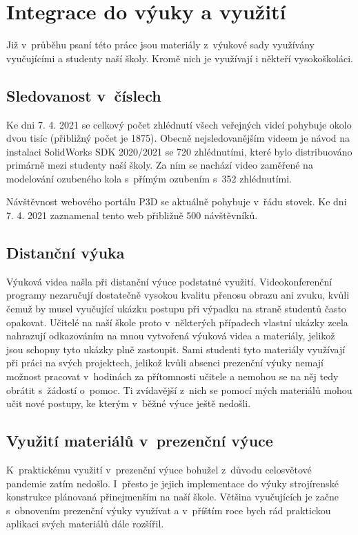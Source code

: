 \chapter{Integrace do výuky a využití}
Již v~průběhu psaní této práce jsou materiály z~výukové sady využívány vyučujícími a studenty naší školy.
Kromě nich je využívají i někteří vysokoškoláci.

\section{Sledovanost v~číslech}
Ke dni 7. 4. 2021 se celkový počet zhlédnutí všech veřejných videí pohybuje okolo dvou tisíc (přibližný počet je 1875).
Obecně nejsledovanějším videem je návod na instalaci SolidWorks SDK 2020/2021 se 720 zhlédnutími, které bylo distribuováno primárně mezi studenty naší školy.
Za ním se nachází video zaměřené na modelování ozubeného kola s~přímým ozubením s~352 zhlédnutími.

Návštěvnost webového portálu P3D se aktuálně pohybuje v~řádu stovek.
Ke dni 7. 4. 2021 zaznamenal tento web přibližně 500 návštěvníků.

\section{Distanční výuka}
Výuková videa našla při distanční výuce podstatné využití.
Videokonferenční programy nezaručují dostatečně vysokou kvalitu přenosu obrazu ani zvuku, kvůli čemuž by musel vyučující ukázku postupu při výpadku na straně studentů často opakovat.
Učitelé na naší škole proto v~některých případech vlastní ukázky zcela nahrazují odkazováním na mnou vytvořená výuková videa a materiály, jelikož jsou schopny tyto ukázky plně zastoupit.
Sami studenti tyto materiály využívají při práci na svých projektech, jelikož kvůli absenci prezenční výuky nemají možnost pracovat v~hodinách za přítomnosti učitele a nemohou se na něj tedy obrátit s~žádostí o~pomoc.
Ti zvídavější z~nich se pomocí mých materiálů mohou učit nové postupy, ke kterým v~běžné výuce ještě nedošli.

\section{Využití materiálů v~prezenční výuce}
K~praktickému využití v~prezenční výuce bohužel z~důvodu celosvětové pandemie zatím nedošlo. 
I~přesto je jejich implementace do výuky strojírenské konstrukce plánovaná přinejmenším na naší škole.
Většina vyučujících je začne s~obnovením prezenční výuky využívat a v~příštím roce bych rád praktickou aplikaci svých materiálů dále rozšířil.

